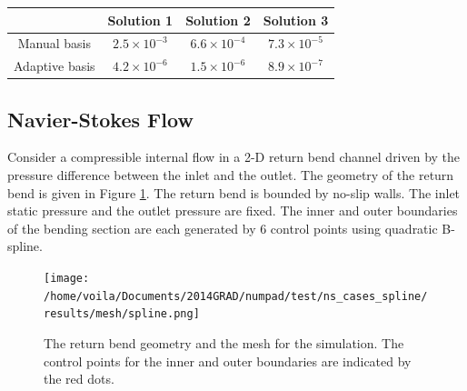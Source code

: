 \begin{center}
    \begin{tabular}{|c|c|c|c|}
       \hline\hline
         & Solution 1 & Solution 2 & Solution 3\\
       \hline
       Manual basis & $2.5\times 10^{-3}$& $6.6\times 10^{-4}$ & $7.3\times 10^{-5}$ \\
       \hline
       Adaptive basis & $4.2\times 10^{-6}$& $1.5\times 10^{-6}$ & $8.9\times 10^{-7}$ \\
       \hline\hline
    \end{tabular}
    \label{table: BL grad error}
\end{center}


\subsection{Navier-Stokes Flow}
\label{sec: chap2 num example NS}
Consider
a compressible internal flow in a 2-D return bend channel 
driven by the pressure difference between the inlet and the outlet.
The geometry of the return bend is given in Figure \ref{fig: NS mesh}.
The return bend is bounded by 
no-slip walls. The inlet static pressure and the outlet pressure are fixed.
The inner and outer boundaries of the bending section are each generated by 6 control points
using quadratic B-spline.\\
\begin{figure}[htbp]\begin{center}
    \texttt{[image: /home/voila/Documents/2014GRAD/numpad/test/ns\_cases\_spline/results/mesh/spline.png]}
    \caption{The return bend geometry and the mesh for the simulation. The control points
             for the inner and outer boundaries are indicated by the red dots.}
    \label{fig: NS mesh}
\end{center}\end{figure}

